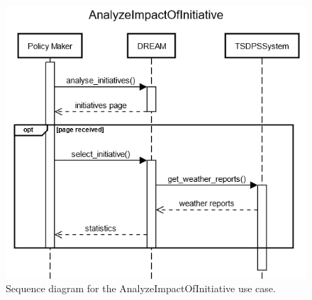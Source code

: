 \documentclass{article}
\begin{document}
\begin{figure}[H]
    \centering
	\includegraphics[scale=0.5]{sequence_diagrams/AnalyzeImpactOfInitiative.png}
    \caption{Sequence diagram for the AnalyzeImpactOfInitiative use case.}
\end{figure}
\newpage
\end{document}
